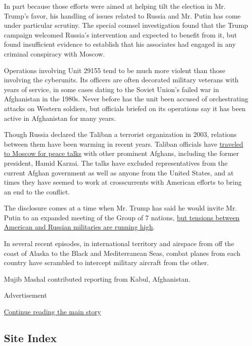 In part because those efforts were aimed at helping tilt the election in
Mr. Trump's favor, his handling of issues related to Russia and Mr.
Putin has come under particular scrutiny. The special counsel
investigation found that the Trump campaign welcomed Russia's
intervention and expected to benefit from it, but found insufficient
evidence to establish that his associates had engaged in any criminal
conspiracy with Moscow.

Operations involving Unit 29155 tend to be much more violent than those
involving the cyberunits. Its officers are often decorated military
veterans with years of service, in some cases dating to the Soviet
Union's failed war in Afghanistan in the 1980s. Never before has the
unit been accused of orchestrating attacks on Western soldiers, but
officials briefed on its operations say it has been active in
Afghanistan for many years.

Though Russia declared the Taliban a terrorist organization in 2003,
relations between them have been warming in recent years. Taliban
officials have
\href{https://www.nytimes.com/2019/02/04/world/asia/afghanistan-taliban-russia-talks-russia.html}{traveled
to Moscow for peace talks} with other prominent Afghans, including the
former president, Hamid Karzai. The talks have excluded representatives
from the current Afghan government as well as anyone from the United
States, and at times they have seemed to work at crosscurrents with
American efforts to bring an end to the conflict.

The disclosure comes at a time when Mr. Trump has said he would invite
Mr. Putin to an expanded meeting of the Group of 7 nations,
\href{https://www.nytimes.com/2020/06/01/us/politics/coronavirus-global-competition-russia-china-iran-north-korea.html}{but
tensions between American and Russian militaries are running high}.

In several recent episodes, in international territory and airspace from
off the coast of Alaska to the Black and Mediterranean Seas, combat
planes from each country have scrambled to intercept military aircraft
from the other.

Mujib Mashal contributed reporting from Kabul, Afghanistan.

Advertisement

\protect\hyperlink{after-bottom}{Continue reading the main story}

\hypertarget{site-index}{%
\subsection{Site Index}\label{site-index}}

